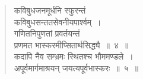 \documentclass[11pt, openany]{book}
\makeatletter
\newcommand{\devanagarinumeral}[1]{%
   \devanagaridigits{\number\csname c@#1\endcsname}}
\makeatother
\begin{document}
\begin{quote}
\vspace{-3mm}
कविबुधजनमूर्धनि स्फुरन्तं \\

\vspace{-5mm}
\hspace{0.5cm} कविबुधसन्ततसेवनीयपार्श्वम्~। \\

\vspace{-5mm}
गणितनिपुणतां प्रवर्तयन्तं \\

\vspace{-5mm}
\hspace{0.5cm} प्रणमत भास्करमीप्सितार्थसिद्ध्यै~॥~४~॥ \\

\vspace{-3mm}
कदापि नैव सम्भ्रमः स्थितश्च भौममण्डले~। \\

\vspace{-5mm}
अपूर्वमार्गमाश्रयन् जयत्यपूर्वभास्करः~॥~५~॥\\
 \end{quote}
\afterpage{\fancyhead[RO,LE]{\textbf{\thepage}}}
\cfoot{}
\newpage
\renewcommand{\thepage}{\devanagarinumeral{page}}
\setcounter{page}{2}
\end{document}
